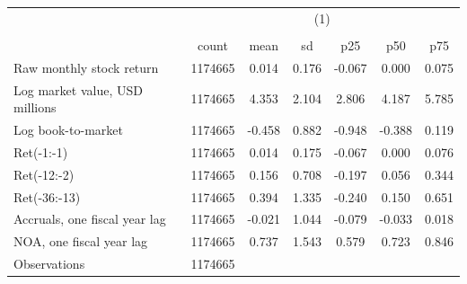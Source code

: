 {
\def\sym#1{\ifmmode^{#1}\else\(^{#1}\)\fi}
\begin{tabular}{l*{1}{cccccc}}
\hline\hline
                    &\multicolumn{6}{c}{(1)}                                                      \\
                    &\multicolumn{6}{c}{}                                                         \\
                    &       count&        mean&          sd&         p25&         p50&         p75\\
\hline
Raw monthly stock return&     1174665&       0.014&       0.176&      -0.067&       0.000&       0.075\\
Log market value, USD millions&     1174665&       4.353&       2.104&       2.806&       4.187&       5.785\\
Log book-to-market  &     1174665&      -0.458&       0.882&      -0.948&      -0.388&       0.119\\
Ret(-1:-1)          &     1174665&       0.014&       0.175&      -0.067&       0.000&       0.076\\
Ret(-12:-2)         &     1174665&       0.156&       0.708&      -0.197&       0.056&       0.344\\
Ret(-36:-13)        &     1174665&       0.394&       1.335&      -0.240&       0.150&       0.651\\
Accruals, one fiscal year lag&     1174665&      -0.021&       1.044&      -0.079&      -0.033&       0.018\\
NOA, one fiscal year lag&     1174665&       0.737&       1.543&       0.579&       0.723&       0.846\\
\hline
Observations        &     1174665&            &            &            &            &            \\
\hline\hline
\end{tabular}
}
